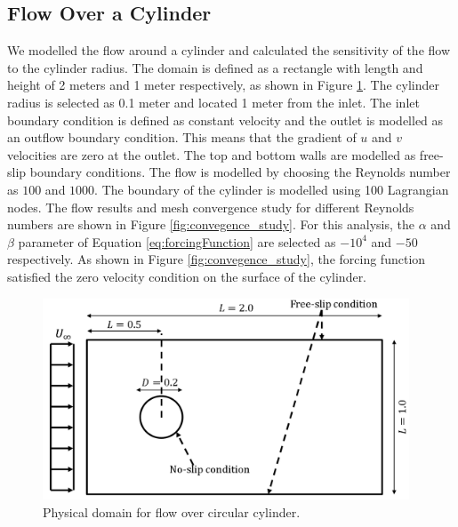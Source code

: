 \documentclass[12pt]{aiaa-pretty}
\begin{document}
\subsection{Flow Over a Cylinder}
We modelled the flow around a cylinder and calculated the sensitivity of the flow to the cylinder radius. The domain is defined as a rectangle with length and height of 2 meters and 1 meter respectively, as shown in Figure \ref{fig:cylinderDomain}. The cylinder radius is selected as 0.1 meter and located 1 meter from the inlet. The inlet boundary condition is defined as constant velocity and the outlet is modelled as an outflow boundary condition. This means that the gradient of $u$ and $v$ velocities are zero at the outlet. The top and bottom walls are modelled as free-slip boundary conditions. The flow is modelled by choosing the Reynolds number as $100$ and $1000$. The boundary of the cylinder is modelled using 100 Lagrangian nodes. The flow results and mesh convergence study for different Reynolds numbers are shown in Figure \ref{fig:convegence_study}. For this analysis, the $\alpha$ and $\beta$ parameter of Equation \eqref{eq:forcingFunction} are selected as $-10^4$ and $-50$ respectively. As shown in Figure \ref{fig:convegence_study}, the forcing function satisfied the zero velocity condition on the surface of the cylinder.

%
\begin{figure}[H]
	\centering
	\includegraphics[height=6.0cm]{figure/cylinder/domain.png}
	\caption{Physical domain for flow over circular cylinder.}
	\label{fig:cylinderDomain}
\end{figure}
%
\end{document}
